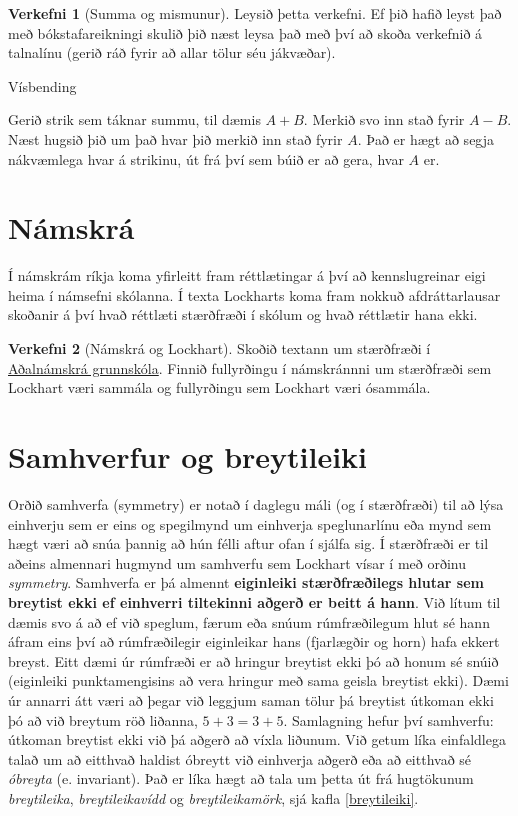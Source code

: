 \documentclass[
  icelandic,
]{book}
\theoremstyle{definition}
\theoremstyle{definition}
\theoremstyle{definition}
\newtheorem{exercise}{Verkefni}[chapter]
\theoremstyle{definition}
\theoremstyle{remark}
\begin{document}
\begin{exercise}[Summa og mismunur]
\protect\hypertarget{exr:exr-summa-mismunur}{}\label{exr:exr-summa-mismunur}Leysið þetta verkefni. Ef þið hafið leyst það með bókstafareikningi skulið þið næst leysa það með því að skoða verkefnið á talnalínu (gerið ráð fyrir að allar tölur séu jákvæðar).
\end{exercise}

Vísbending

Gerið strik sem táknar summu, til dæmis \(A+B\). Merkið svo inn stað fyrir \(A-B\). Næst hugsið þið um það hvar þið merkið inn stað fyrir \(A\). Það er hægt að segja nákvæmlega hvar á strikinu, út frá því sem búið er að gera, hvar \(A\) er.

\section{Námskrá}\label{namskra-lockhart}

Í námskrám ríkja koma yfirleitt fram réttlætingar á því að kennslugreinar eigi heima í námsefni skólanna. Í texta Lockharts koma fram nokkuð afdráttarlausar skoðanir á því hvað réttlæti stærðfræði í skólum og hvað réttlætir hana ekki.

\begin{exercise}[Námskrá og Lockhart]
\protect\hypertarget{exr:exr-verkefni-namskra-lockhart}{}\label{exr:exr-verkefni-namskra-lockhart}Skoðið textann um stærðfræði í \href{https://www.adalnamskra.is/grunnskoli/kafli-25-staerdfraedi-2024}{Aðalnámskrá grunnskóla}. Finnið fullyrðingu í námskránnni um stærðfræði sem Lockhart væri sammála og fullyrðingu sem Lockhart væri ósammála.
\end{exercise}

\section{Samhverfur og breytileiki}\label{samhverfur}

Orðið samhverfa (symmetry) er notað í daglegu máli (og í stærðfræði) til að lýsa einhverju sem er eins og spegilmynd um einhverja speglunarlínu eða mynd sem hægt væri að snúa þannig að hún félli aftur ofan í sjálfa sig. Í stærðfræði er til aðeins almennari hugmynd um samhverfu sem Lockhart vísar í með orðinu \emph{symmetry}. Samhverfa er þá almennt \textbf{eiginleiki stærðfræðilegs hlutar sem breytist ekki ef einhverri tiltekinni aðgerð er beitt á hann}. Við lítum til dæmis svo á að ef við speglum, færum eða snúum rúmfræðilegum hlut sé hann áfram eins því að rúmfræðilegir eiginleikar hans (fjarlægðir og horn) hafa ekkert breyst. Eitt dæmi úr rúmfræði er að hringur breytist ekki þó að honum sé snúið (eiginleiki punktamengisins að vera hringur með sama geisla breytist ekki). Dæmi úr annarri átt væri að þegar við leggjum saman tölur þá breytist útkoman ekki þó að við breytum röð liðanna, \(5+3=3+5\). Samlagning hefur því samhverfu: útkoman breytist ekki við þá aðgerð að víxla liðunum. Við getum líka einfaldlega talað um að eitthvað haldist óbreytt við einhverja aðgerð eða að eitthvað sé \emph{óbreyta} (e. invariant). Það er líka hægt að tala um þetta út frá hugtökunum \emph{breytileika}, \emph{breytileikavídd} og \emph{breytileikamörk}, sjá kafla \ref{breytileiki}.
\end{document}
